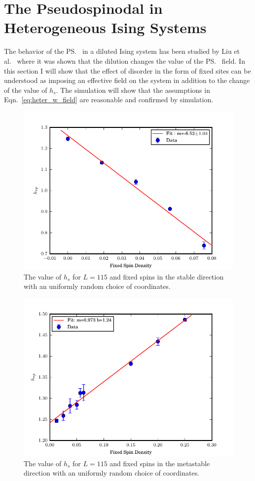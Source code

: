 \section{The Pseudospinodal in Heterogeneous Ising Systems}

The behavior of the \ps\ in a diluted Ising system has been studied by Liu et al.~\cite{kangdilute} where it was shown that the dilution changes the value of the \ps\ field. In this section I will show that the effect of disorder in the form of fixed sites can be understood as imposing an effective field on the system in addition to the change of the value of $h_s$. The simulation will show that the assumptions in Eqn.~\eqref{eq:heter_w_field} are reasonable and confirmed by simulation. 
\begin{figure}[!h]
  \centering
  \includegraphics[scale=1.0]{Figures/spinodal/fixSpin1n_115.pdf}
  \caption{The value of $h_s$ for $L=115$ and fixed spins in the stable direction with an uniformly random choice of coordinates.}
  \label{fig:ps_heter_n}
\end{figure}%
\begin{figure}[!h]
  \centering
      \includegraphics[scale=1.0]{Figures/spinodal/fixSpin1p_200.pdf}
  \caption{The value of $h_s$ for $L=115$ and fixed spins in the metastable direction with an uniformly random choice of coordinates.}
  \label{fig:ps_heter_p}
\end{figure}%


